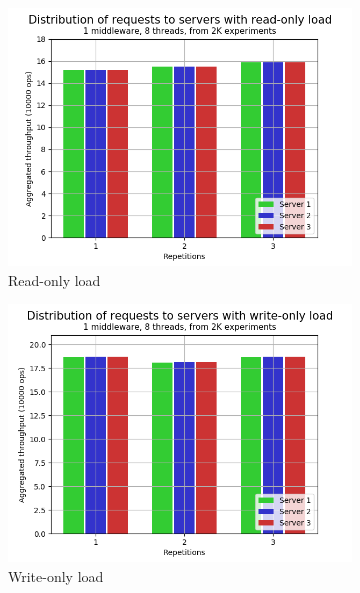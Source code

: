 \documentclass[11pt,a4paper]{article}
\begin{document}
\begin{figure}[h]
\centering
\begin{subfigure}{.33\textwidth}
  \centering
  \includegraphics[width=1.0\linewidth,trim={0px 0px 0px 0px},clip]{img/plot/equal-load-read-only.png}
  \caption{Read-only load}
  \label{fig:equal-load-read-only}
\end{subfigure}%
\begin{subfigure}{.33\textwidth}
  \centering
  \includegraphics[width=1.0\linewidth,trim={0px 0px 0px 0px},clip]{img/plot/equal-load-write-only.png}
  \caption{Write-only load}
  \label{fig:equal-load-write-only}
\end{subfigure}%
\begin{subfigure}{.33\textwidth}

\end{subfigure}
\end{figure}
\end{document}
